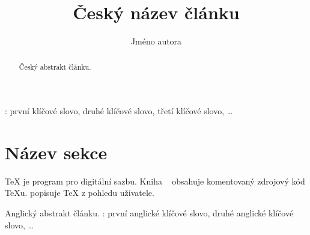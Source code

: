 \documentclass{csbulletin}
\begin{document}
\title{Český název článku}
\author{Jméno autora}
\maketitle

\begin{abstract}
Český abstrakt článku.
\end{abstract}
\klicovaslova: první klíčové slovo, druhé klíčové slovo, třetí klíčové slovo, …

\section{Název sekce}
\TeX{} je program pro digitální sazbu. Kniha ~\cite{knuth-ttp} obsahuje komentovaný zdrojový kód \TeX u. \textcite{knuth-tb} popisuje \TeX{} z pohledu uživatele.

\printbibliography

\begin{summary}
Anglický abstrakt článku.
\keywords: první anglické klíčové slovo, druhé anglické klíčové slovo, …
\end{summary}
\end{document}

